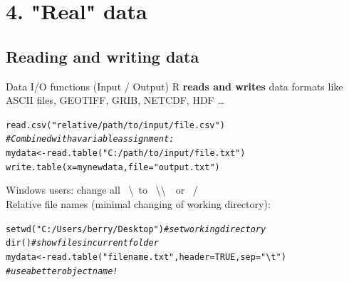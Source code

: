 \documentclass[xcolor=table,       handout,    xcolor=dvipsnames]{beamer}\usepackage[]{graphicx}\usepackage[]{color}
\makeatletter
\newcommand{\hlnum}[1]{\textcolor[rgb]{0,0,0}{#1}}
\newcommand{\hlstr}[1]{\textcolor[rgb]{0.545,0.137,0.137}{#1}}
\newcommand{\hlcom}[1]{\textcolor[rgb]{0,0.392,0}{\textit{#1}}}
\newcommand{\hlstd}[1]{\textcolor[rgb]{0,0,0}{#1}}
\newcommand{\hlkwb}[1]{\textcolor[rgb]{0,0,0}{#1}}
\newcommand{\hlkwc}[1]{\textcolor[rgb]{1,0,1}{#1}}
\newcommand{\hlkwd}[1]{\textcolor[rgb]{0,0,1}{#1}}
\newenvironment{kframe}{%
 \def\at@end@of@kframe{}%
 \ifinner\ifhmode%
  \def\at@end@of@kframe{\end{minipage}}%
  \begin{minipage}{\columnwidth}%
 \fi\fi%
 \def\FrameCommand##1{\hskip\@totalleftmargin \hskip-\fboxsep
 \colorbox{shadecolor}{##1}\hskip-\fboxsep
     \hskip-\linewidth \hskip-\@totalleftmargin \hskip\columnwidth}%
 \MakeFramed {\advance\hsize-\width
   \@totalleftmargin\z@ \linewidth\hsize
   \@setminipage}}%
 {\par\unskip\endMakeFramed%
 \at@end@of@kframe}
\newenvironment{knitrout}{}{} %
\makeatother
\begin{document}
\section{4. "Real" data}

\subsection{Reading and writing data}

\begin{frame}[fragile]{Data I/O functions (Input / Output)}
R \textbf{reads and writes} data formats like ASCII files, GEOTIFF, GRIB, NETCDF, HDF \ldots
\pause
\begin{knitrout}
\color{fgcolor}\begin{kframe}
\begin{alltt}
\hlkwd{read.csv}\hlstd{(}\hlstr{"relative/path/to/input/file.csv"}\hlstd{)}
\hlcom{# Combined with a variable assignment:}
\hlstd{mydata} \hlkwb{<-} \hlkwd{read.table}\hlstd{(}\hlstr{"C:/path/to/input/file.txt"}\hlstd{)}
\hlkwd{write.table}\hlstd{(}\hlkwc{x}\hlstd{=mynewdata,} \hlkwc{file}\hlstd{=}\hlstr{"output.txt"}\hlstd{)}
\end{alltt}
\end{kframe}
\end{knitrout}
Windows users: change all \ \textbackslash \ to \ \textbackslash\textbackslash \ \ or \ / \\[\baselineskip]
\pause
Relative file names (minimal changing of working directory):
\begin{knitrout}
\color{fgcolor}\begin{kframe}
\begin{alltt}
\hlkwd{setwd}\hlstd{(}\hlstr{"C:/Users/berry/Desktop"}\hlstd{)} \hlcom{# set working directory}
\hlkwd{dir}\hlstd{()} \hlcom{# show files in current folder}
\hlstd{mydata} \hlkwb{<-} \hlkwd{read.table}\hlstd{(}\hlstr{"filename.txt"}\hlstd{,} \hlkwc{header}\hlstd{=}\hlnum{TRUE}\hlstd{,} \hlkwc{sep}\hlstd{=}\hlstr{"\textbackslash{}t"}\hlstd{)}
\hlcom{# use a better object name!}
\end{alltt}
\end{kframe}
\end{knitrout}
\end{frame}
\end{document}
